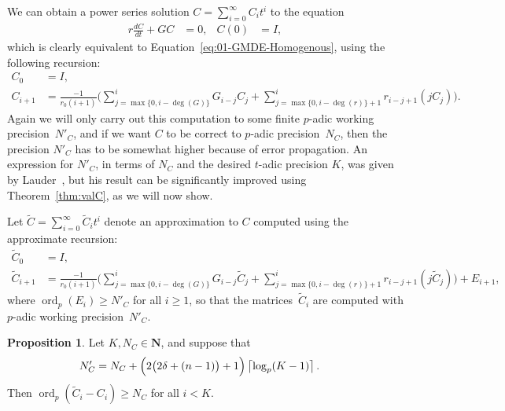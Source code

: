\documentclass[a4paper,11pt]{article}
\numberwithin{equation}{section}
\providecommand{\ceil}[1]{\left\lceil#1\right\rceil}   %
\newcommand{\NN}{\mathbf{N}} %
\DeclareMathOperator{\ord}{ord}          %
\theoremstyle{definition}
\newtheorem{prop}[thm]{Proposition}
\begin{document}
We can obtain a power series solution $C = \sum_{i=0}^{\infty} C_i t^i$ to
the equation
\begin{align*}
r \frac{dC}{dt} + G C &= 0, &C(0)& = I,
\end{align*}
which is clearly equivalent to 
Equation~\eqref{eq:01-GMDE-Homogenous}, using the following recursion:  
\begin{align} \label{eq:recursiondifeq}
C_0 &= I, \nonumber \\
C_{i+1} &= \frac{-1}{r_0 (i+1)} \biggl(
    \sum_{j=\max{\{0,i-\deg(G)\}}}^i G_{i-j} C_j + 
    \sum_{j=\max{\{0,i-\deg(r)\}}+1}^i r_{i-j+1} (j C_j) \biggr).
\end{align}
Again we will only carry out this computation to some finite $p$-adic 
working precision~$N'_C$, and if we want $C$ to be correct to $p$-adic 
precision~$N_C$, then the precision $N'_C$ has to be somewhat higher 
because of error propagation. An expression for $N'_C$, in terms of 
$N_C$ and the desired $t$-adic precision $K$, was given by 
Lauder~\citep[Theorem~5.1]{Lauder2006}, but his result can be
significantly improved using Theorem~\ref{thm:valC}, as we will now show. 

Let $\tilde{C}=\sum_{i=0}^{\infty} \tilde{C}_i t^i$ denote an 
approximation to $C$ computed using the approximate recursion:  
\begin{align*}
\tilde{C}_0 &= I, \\
\tilde{C}_{i+1} &= \frac{-1}{r_0 (i+1)} \biggl(
    \sum_{j=\max{\{0,i-\deg({G})\}}}^i {G}_{i-j} \tilde{C}_j + 
    \sum_{j=\max{\{0,i-\deg({r})\}}+1}^i {r}_{i-j+1} (j \tilde{C}_j) \biggr) + {E}_{i+1},
\end{align*}
where $\ord_p({E}_i) \geq N'_{C}$ for all $i \geq 1$, 
so that the matrices~$\tilde{C}_i$ are computed with $p$-adic working 
precision~$N'_C$.

\begin{prop} \label{thm:errorprop}
Let $K,N_{C} \in \NN$, and suppose that
\begin{align*}
N'_C          &= N_{C} + \Bigl(2 \bigl(2 \delta + (n-1)\bigr) + 1\Bigr) \ceil{\log_p(K-1)}.
\end{align*} 
Then $\ord_p(\tilde{C}_i-C_i) \geq N_{C}$ for all $i < K$.
\end{prop}
\end{document}
